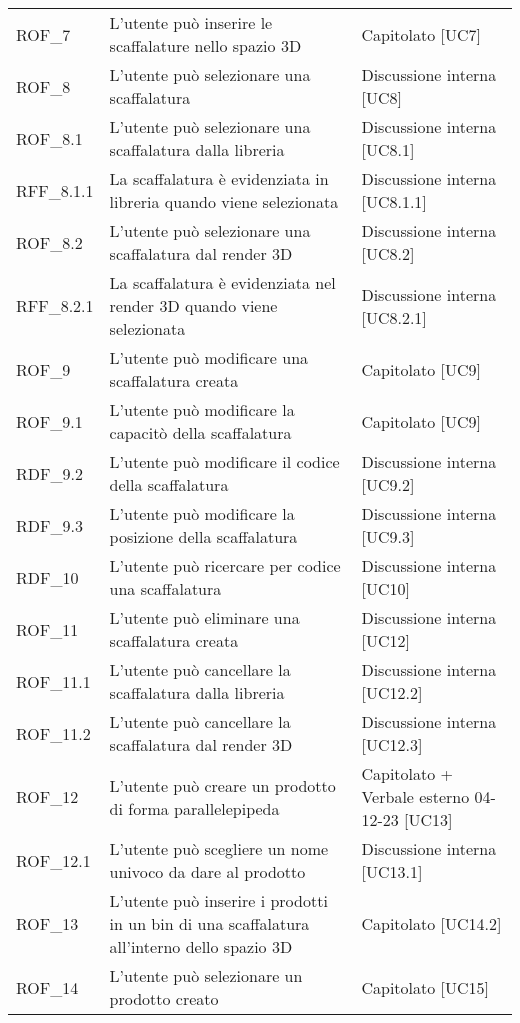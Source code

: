 \begin{xltabular}{\textwidth}{ p{0.2\textwidth} | X | p{0.2\textwidth} }
    ROF\_7& L'utente può inserire le scaffalature nello spazio 3D & Capitolato [UC7]\\
    ROF\_8& L'utente può selezionare una scaffalatura & Discussione interna [UC8]\\
    ROF\_8.1& L'utente può selezionare una scaffalatura dalla libreria & Discussione interna [UC8.1]\\
    RFF\_8.1.1& La scaffalatura è evidenziata in libreria quando viene selezionata & Discussione interna [UC8.1.1]\\
    ROF\_8.2& L'utente può selezionare una scaffalatura dal render 3D & Discussione interna [UC8.2]\\
    RFF\_8.2.1& La scaffalatura è evidenziata nel render 3D quando viene selezionata & Discussione interna [UC8.2.1]\\
    ROF\_9& L'utente può modificare una scaffalatura creata & Capitolato [UC9]\\
    ROF\_9.1& L'utente può modificare la capacitò della scaffalatura & Capitolato [UC9]\\
    RDF\_9.2& L'utente può modificare il codice della scaffalatura & Discussione interna [UC9.2]\\
    RDF\_9.3& L'utente può modificare la posizione della scaffalatura & Discussione interna [UC9.3]\\
    RDF\_10& L'utente può ricercare per codice una scaffalatura & Discussione interna [UC10]\\
    ROF\_11& L'utente può eliminare una scaffalatura creata & Discussione interna [UC12]\\
    ROF\_11.1& L'utente può cancellare la scaffalatura dalla libreria & Discussione interna [UC12.2]\\
    ROF\_11.2& L'utente può cancellare la scaffalatura dal render 3D & Discussione interna [UC12.3]\\
    ROF\_12& L'utente può creare un prodotto di forma parallelepipeda & Capitolato + Verbale esterno 04-12-23 [UC13]\\
    ROF\_12.1& L'utente può scegliere un nome univoco da dare al prodotto & Discussione interna [UC13.1]\\
    ROF\_13& L'utente può inserire i prodotti in un bin di una scaffalatura all'interno dello spazio 3D & Capitolato [UC14.2]\\
    ROF\_14& L'utente può selezionare un prodotto creato & Capitolato [UC15]\\

\end{xltabular}
